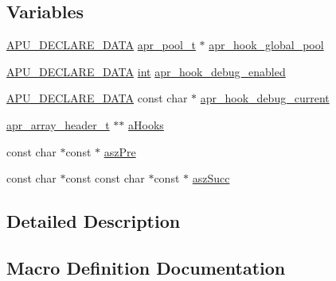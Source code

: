 \subsection*{Variables}
\begin{DoxyCompactItemize}
\item 
\hyperlink{group__APR__Util_ga7009cc3d445c4b2f93c80990230d7b3f}{A\+P\+U\+\_\+\+D\+E\+C\+L\+A\+R\+E\+\_\+\+D\+A\+TA} \hyperlink{structapr__pool__t}{apr\+\_\+pool\+\_\+t} $\ast$ \hyperlink{group__APR__Util__Hook_gabef8cf5f8a4528192b0aa66200b09ccc}{apr\+\_\+hook\+\_\+global\+\_\+pool}
\item 
\hyperlink{group__APR__Util_ga7009cc3d445c4b2f93c80990230d7b3f}{A\+P\+U\+\_\+\+D\+E\+C\+L\+A\+R\+E\+\_\+\+D\+A\+TA} \hyperlink{pcre_8txt_a42dfa4ff673c82d8efe7144098fbc198}{int} \hyperlink{group__APR__Util__Hook_ga26d9c49c3b7bd6717b7156c359d16f99}{apr\+\_\+hook\+\_\+debug\+\_\+enabled}
\item 
\hyperlink{group__APR__Util_ga7009cc3d445c4b2f93c80990230d7b3f}{A\+P\+U\+\_\+\+D\+E\+C\+L\+A\+R\+E\+\_\+\+D\+A\+TA} const char $\ast$ \hyperlink{group__APR__Util__Hook_ga00ffe8fc20d32058fbdda6b3a4fe4fd3}{apr\+\_\+hook\+\_\+debug\+\_\+current}
\item 
\hyperlink{structapr__array__header__t}{apr\+\_\+array\+\_\+header\+\_\+t} $\ast$$\ast$ \hyperlink{group__APR__Util__Hook_ga242711e58a02557bca364aa506746d8b}{a\+Hooks}
\item 
const char $\ast$const $\ast$ \hyperlink{group__APR__Util__Hook_ga8daee2cc4d5ba6e3b82b2f45cc2920a1}{asz\+Pre}
\item 
const char $\ast$const const char $\ast$const $\ast$ \hyperlink{group__APR__Util__Hook_ga4dedfeea57daba4a4579d174e94e5afc}{asz\+Succ}
\end{DoxyCompactItemize}


\subsection{Detailed Description}


\subsection{Macro Definition Documentation}
